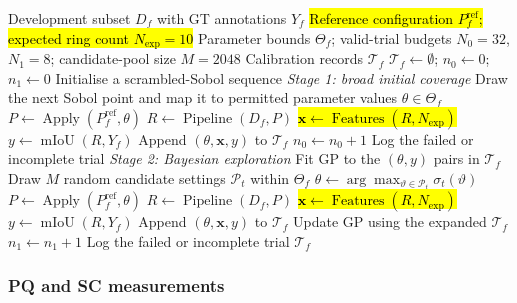 \documentclass[a4paper,fleqn]{cas-dc}
\begin{document}
{\begin{algorithm}[ht]
\caption{Generating calibration examples through space-filling
sampling and Bayesian exploration}
\label{alg:bo_exploration}
\begin{algorithmic}[1]
\Require Development subset $D_f$ with GT annotations $Y_f$
\Require \hl{Reference configuration $P_f^{\mathrm{ref}}$; expected ring count $N_{\mathrm{exp}}=10$}
\Require Parameter bounds $\Theta_f$;
         valid-trial budgets $N_0=32$, $N_1=8$;
         candidate-pool size $M=2048$
\Ensure Calibration records $\mathcal{T}_f$
\State $\mathcal{T}_f\gets\emptyset$;
       $n_0\gets0$; $n_1\gets0$
\State Initialise a scrambled-Sobol sequence
\Statex \textit{Stage 1: broad initial coverage}
    \State Draw the next Sobol point and map it to
           permitted parameter values $\theta\in\Theta_f$
    \State $P\gets\operatorname{Apply}
           (P_f^{\mathrm{ref}},\theta)$
    \State $R\gets\operatorname{Pipeline}(D_f,P)$
        \State \hl{$\mathbf{x}\gets\operatorname{Features}(R,N_{\mathrm{exp}})$}
        \State $y\gets\operatorname{mIoU}(R,Y_f)$
        \State Append $(\theta,\mathbf{x},y)$
               to $\mathcal{T}_f$
        \State $n_0\gets n_0+1$
    \Else
        \State Log the failed or incomplete trial
    \EndIf
\EndWhile
\Statex \textit{Stage 2: Bayesian exploration}
\State Fit GP to the $(\theta,y)$ pairs in $\mathcal{T}_f$
    \State Draw $M$ random candidate settings
           $\mathcal{P}_t$ within $\Theta_f$
    \State $\theta\gets
           \arg\max_{\vartheta\in\mathcal{P}_t}
           \sigma_t(\vartheta)$
    \State $P\gets\operatorname{Apply}
           (P_f^{\mathrm{ref}},\theta)$
    \State $R\gets\operatorname{Pipeline}(D_f,P)$
        \State \hl{$\mathbf{x}\gets\operatorname{Features}(R,N_{\mathrm{exp}})$}
        \State $y\gets\operatorname{mIoU}(R,Y_f)$
        \State Append $(\theta,\mathbf{x},y)$
               to $\mathcal{T}_f$
        \State Update GP using the expanded $\mathcal{T}_f$
        \State $n_1\gets n_1+1$
    \Else
        \State Log the failed or incomplete trial
    \EndIf
\EndWhile
\State \Return $\mathcal{T}_f$
\end{algorithmic}
\end{algorithm}

\subsubsection{PQ and SC measurements}
\label{sec:features}

}
\end{document}
